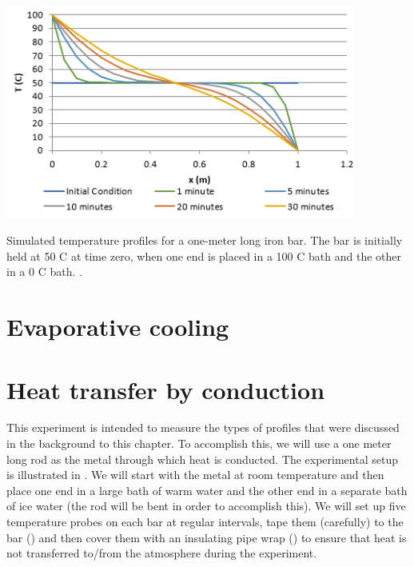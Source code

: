 \begin{marginfigure}[-3cm]
	\begin{center}
		\includegraphics[height=7cm]{Images/diffusionplot.png}
		\caption[Numerical Solution to Diffusion Equation]{Simulated temperature profiles for a one-meter long iron bar.  The bar is initially held at 50 \textdegree C at time zero, when one end is placed in a 100 \textdegree C bath and the other in a 0 \textdegree C bath.  .}
	\end{center}
\end{marginfigure}

\section{\color{gray} Evaporative cooling \color{black}}
\section{Heat transfer by conduction}

This experiment is intended to measure the types of profiles that were discussed in the background to this chapter.
To accomplish this, we will use a one meter long rod as the metal through which heat is conducted.
The experimental setup is illustrated in .
We will start with the metal at room temperature and then place one end in a large bath of warm water and the other end in a separate bath of ice water (the rod will be bent in order to accomplish this).
We will set up five temperature probes on each bar at regular intervals, tape them (carefully) to the bar () and then cover them with an insulating pipe wrap () to ensure that heat is not transferred to/from the atmosphere during the experiment.

